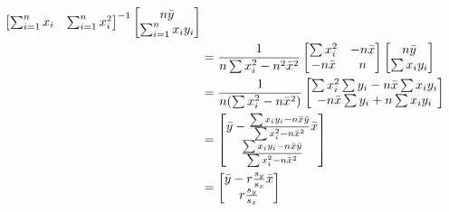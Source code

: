 \documentclass[12pt]{article}
\begin{document}
\begin{enumerate}
{\begin{align*}
\begin{bmatrix}
        \sum_{i = 1}^n x_i & \sum_{i = 1}^n x_i^2
    \end{bmatrix}^{-1} \begin{bmatrix}
        n \bar{y} \\
        \sum_{i = 1}^n x_i y_i
    \end{bmatrix} \\
    &= \frac{1}{n \sum x_i^2 - n^2 \bar{x}^2} \begin{bmatrix}
        \sum x_i^2 & -n \bar{x} \\
        -n \bar{x} & n
    \end{bmatrix} \begin{bmatrix}
        n \bar{y} \\
        \sum x_i y_i
    \end{bmatrix} \\
    &= \frac{1}{n(\sum x_i^2 - n\bar{x}^2)} \begin{bmatrix}
        \sum x_i^2 \sum y_i - n \bar{x} \sum x_iy_i \\
        -n \bar{x} \sum y_i + n \sum x_iy_i
    \end{bmatrix} \\
    &= \begin{bmatrix}
        \bar{y} - \frac{\sum x_iy_i - n\bar{x}\bar{y}}{\sum x_i^2 - n\bar{x}^2} \bar{x} \\
        \frac{\sum x_iy_i - n\bar{x}\bar{y}}{\sum x_i^2 - n\bar{x}^2}
    \end{bmatrix} \\
    &= \begin{bmatrix}
        \bar{y} - r\frac{s_y}{s_x} \bar{x} \\
        r\frac{s_y}{s_x}
    \end{bmatrix}
\end{align*}
}



\end{enumerate}
\end{document}
